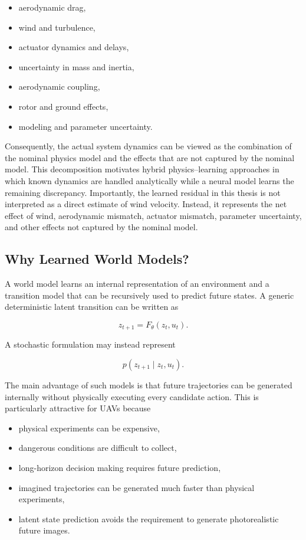 \documentclass[conference]{IEEEtran}
\begin{document}
\begin{itemize}
    \item aerodynamic drag,
    \item wind and turbulence,
    \item actuator dynamics and delays,
    \item uncertainty in mass and inertia,
    \item aerodynamic coupling,
    \item rotor and ground effects,
    \item modeling and parameter uncertainty.
\end{itemize}

Consequently, the actual system dynamics can be viewed as the
combination of the nominal physics model and the effects that are not
captured by the nominal model. This decomposition motivates hybrid physics--learning approaches in
which known dynamics are handled analytically while a neural model
learns the remaining discrepancy. Importantly, the learned residual in this thesis is not interpreted as
a direct estimate of wind velocity. Instead, it represents the net
effect of wind, aerodynamic mismatch, actuator mismatch, parameter
uncertainty, and other effects not captured by the nominal model.


\subsection{Why Learned World Models?}

A world model learns an internal representation of an environment and a
transition model that can be recursively used to predict future states.
A generic deterministic latent transition can be written as

\begin{equation}
z_{t+1}
=
F_{\theta}(z_t,u_t).
\end{equation}

A stochastic formulation may instead represent

\begin{equation}
p(z_{t+1}\mid z_t,u_t).
\end{equation}

The main advantage of such models is that future trajectories can be
generated internally without physically executing every candidate
action. This is particularly attractive for UAVs because

\begin{itemize}
    \item physical experiments can be expensive,
    \item dangerous conditions are difficult to collect,
    \item long-horizon decision making requires future prediction,
    \item imagined trajectories can be generated much faster than
    physical experiments,
    \item latent state prediction avoids the requirement to generate
    photorealistic future images.
\end{itemize}
\end{document}
